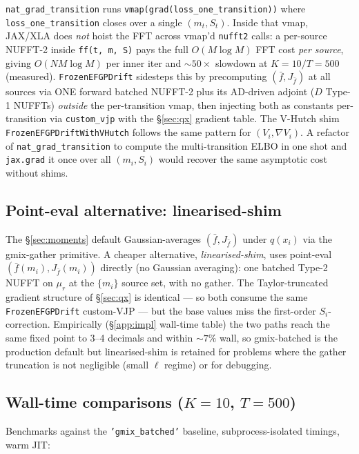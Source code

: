 \documentclass[11pt]{article}
\newcommand{\code}[1]{\texttt{\small #1}}
\begin{document}
\code{nat\_grad\_transition} runs
\code{vmap(grad(loss\_one\_transition))} where
\code{loss\_one\_transition} closes over a single $(m_t, S_t)$. Inside
that vmap, JAX/XLA does \emph{not} hoist the FFT across vmap'd
\code{nufft2} calls: a per-source NUFFT-2 inside \code{ff(t, m, S)}
pays the full $O(M\log M)$ FFT cost \emph{per source}, giving
$O(NM\log M)$ per inner iter and ${\sim}50\times$ slowdown at
$K{=}10/T{=}500$ (measured). \code{FrozenEFGPDrift} sidesteps this by
precomputing $(\bar f, J_{\bar f})$ at all sources via ONE forward
batched NUFFT-2 plus its AD-driven adjoint ($D$ Type-1 NUFFTs)
\emph{outside} the per-transition vmap, then injecting both as constants
per-transition via \code{custom\_vjp} with the §\ref{sec:qx} gradient
table. The V-Hutch shim
\code{FrozenEFGPDriftWithVHutch} follows the same pattern for
$(V_i, \nabla V_i)$. A refactor of \code{nat\_grad\_transition} to
compute the multi-transition ELBO in one shot and \code{jax.grad} it
once over all $(m_i, S_i)$ would recover the same asymptotic cost
without shims.

\subsection{Point-eval alternative: linearised-shim}

The §\ref{sec:moments} default Gaussian-averages $(\bar f, J_{\bar f})$
under $q(x_i)$ via the gmix-gather primitive. A cheaper alternative,
\emph{linearised-shim}, uses point-eval $(\bar f(m_i), J_{\bar f}(m_i))$
directly (no Gaussian averaging): one batched Type-2 NUFFT on $\mu_r$
at the $\{m_i\}$ source set, with no gather. The Taylor-truncated
gradient structure of §\ref{sec:qx} is identical --- so both consume
the same \code{FrozenEFGPDrift} custom-VJP --- but the base values
miss the first-order $S_i$-correction. Empirically (§\ref{app:impl}
wall-time table) the two paths reach the same fixed point to 3--4
decimals and within ${\sim}7\%$ wall, so gmix-batched is the production
default but linearised-shim is retained for problems where the
gather truncation is not negligible (small $\ell$ regime) or for
debugging.

\subsection{Wall-time comparisons ($K=10$, $T=500$)}

Benchmarks against the \code{'gmix\_batched'} baseline,
subprocess-isolated timings, warm JIT:
\end{document}
